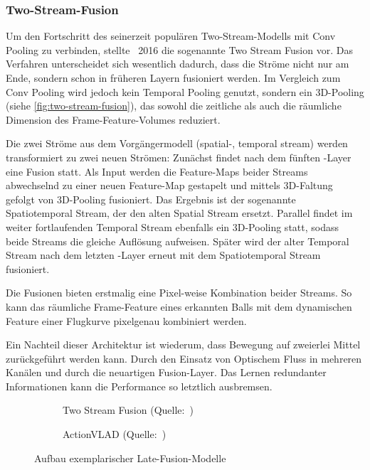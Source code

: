 \subsubsection{Two-Stream-Fusion}

Um den Fortschritt des seinerzeit populären Two-Stream-Modells mit Conv Pooling zu verbinden, stellte~\cite{Feichtenhofer16} 2016 die sogenannte Two Stream Fusion vor.
Das Verfahren unterscheidet sich wesentlich dadurch, dass die Ströme nicht nur am Ende, sondern schon in früheren Layern fusioniert werden.
Im Vergleich zum Conv Pooling wird jedoch kein Temporal Pooling genutzt, sondern ein 3D-Pooling (siehe \autoref{fig:two-stream-fusion}), das sowohl die zeitliche als auch die räumliche Dimension des Frame-Feature-Volumes reduziert.

Die zwei Ströme aus dem Vorgängermodell (spatial-, temporal stream) werden transformiert zu zwei neuen Strömen:
Zunächst findet nach dem fünften \conv-Layer eine Fusion statt.
Als Input werden die Feature-Maps beider Streams abwechselnd zu einer neuen Feature-Map gestapelt und mittels 3D-Faltung gefolgt von 3D-Pooling fusioniert.
Das Ergebnis ist der sogenannte Spatiotemporal Stream, der den alten Spatial Stream ersetzt.
Parallel findet im weiter fortlaufenden Temporal Stream ebenfalls ein 3D-Pooling statt, sodass beide Streams die gleiche Auflösung aufweisen.
Später wird der alter Temporal Stream nach dem letzten \fc-Layer erneut mit dem Spatiotemporal Stream fusioniert.

Die Fusionen bieten erstmalig eine Pixel-weise Kombination beider Streams.
So kann \zB das räumliche Frame-Feature eines erkannten Balls mit dem dynamischen Feature einer Flugkurve pixelgenau kombiniert werden.

Ein Nachteil dieser Architektur ist wiederum, dass Bewegung auf zweierlei Mittel zurückgeführt werden kann.
Durch den Einsatz von Optischem Fluss in mehreren Kanälen und durch die neuartigen Fusion-Layer.
Das Lernen redundanter Informationen kann die Performance so letztlich ausbremsen.

\begin{figure}
    \centering
    \begin{subfigure}[b]{.5\textwidth}
        \centering
        \caption{Two Stream Fusion (Quelle:~\cite{Feichtenhofer16})}
        \label{fig:two-stream-fusion}
    \end{subfigure}%
    \hfill
    \begin{subfigure}[b]{.5\textwidth}
        \centering
        \caption{ActionVLAD (Quelle:~\cite{Girdhar17})}
        \label{fig:avlad}
    \end{subfigure}
    \caption{Aufbau exemplarischer Late-Fusion-Modelle}
\end{figure}

